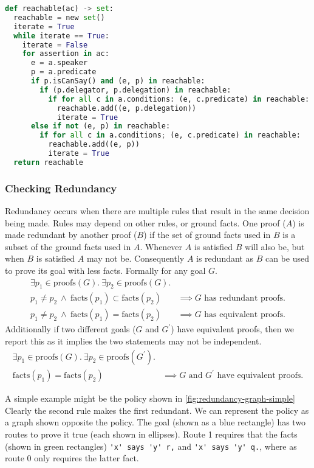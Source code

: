\documentclass[a4paper]{scrartcl}
\begin{document}
\begin{lstlisting}[language=Python,float,caption={Procedure for finding all reachable assertions.},label={alg:reachable}]
def reachable(ac) -> set:
  reachable = new set()
  iterate = True
  while iterate == True:
    iterate = False
    for assertion in ac:
      e = a.speaker
      p = a.predicate
      if p.isCanSay() and (e, p) in reachable:
        if (p.delegator, p.delegation) in reachable:
          if for all c in a.conditions: (e, c.predicate) in reachable:
            reachable.add((e, p.delegation))
            iterate = True
      else if not (e, p) in reachable:
        if for all c in a.conditions; (e, c.predicate) in reachable:
          reachable.add((e, p))
          iterate = True
  return reachable
\end{lstlisting}

\subsubsection{Checking Redundancy}

Redundancy occurs when there are multiple rules that result in the same decision being
made.  Rules may depend on other rules, or ground facts.  One proof ($A$) is made
redundant by another proof ($B$) if the set of ground facts used in $B$ is a
subset of the ground facts used in $A$. Whenever $A$ is satisfied $B$ will also
be, but when $B$ is satisfied $A$ may not be.  Consequently $A$ is redundant as
$B$ can be used to prove its goal with less facts.
Formally for any goal $G$.
\begin{align*}
  \exists p_1 \in \text{proofs}(G).~\exists p_2 \in \text{proofs}(G).&\\
  p_1 \not= p_2~\wedge~\text{facts}(p_1) \subset \text{facts}(p_2)&\implies G\text{ has redundant proofs.} \\
  p_1 \not= p_2~\wedge~\text{facts}(p_1) = \text{facts}(p_2)&\implies G\text{ has equivalent proofs.}
\end{align*}
Additionally if two different goals ($G$ and $G^\prime$) have equivalent proofs, then we report this
as it implies the two statements may not be independent.
\begin{align*}
  \exists p_1 \in \text{proofs}(G).~\exists p_2 \in \text{proofs}(G^\prime).&\\
  \text{facts}(p_1) = \text{facts}(p_2)&\implies \text{$G$ and $G^\prime$ have equivalent proofs.}
\end{align*}


A simple example might be the policy shown in \autoref{fig:redundancy-graph-simple}
Clearly the second rule makes the first redundant.  We can represent the policy
as a graph shown opposite the policy.  The goal (shown as a blue rectangle) has two routes
to prove it true (each shown in ellipses).  Route 1 requires that the facts
(shown in green rectangles) \lstinline!'x' says 'y' r,! and
\lstinline!'x' says 'y' q.!, where as route 0 only requires the
latter fact.
\end{document}
